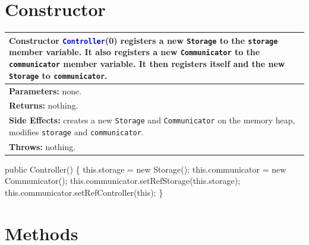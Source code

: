 \section{Constructor}
\begin{tabular}{p{\textwidth}}
\toprule
\rowcolor{TableTitle}
Constructor \textcolor{blue}{{\tt{}Controller}}(0) registers a new {\tt{}Storage} to
the {\tt{}storage} member variable. It also registers a new {\tt{}Communicator} to
the {\tt{}communicator} member variable. It then registers itself and the new
{\tt{}Storage} to {\tt{}communicator}.\\
\midrule
\textbf{Parameters:} none.\\
\textbf{Returns:} nothing.\\
\textbf{Side Effects:} creates a new {\tt{}Storage} and {\tt{}Communicator} on the
memory heap, modifies {\tt{}storage} and {\tt{}communicator}.\\
\textbf{Throws:} nothing.\\
\bottomrule
\end{tabular}
\nwenddocs{}\endmoddef{}
public Controller() \{
  this.storage = new Storage();
  this.communicator = new Communicator();
  this.communicator.setRefStorage(this.storage);
  this.communicator.setRefController(this);
\}
\nwendcode{}\nwdocspar

\section{Methods}


